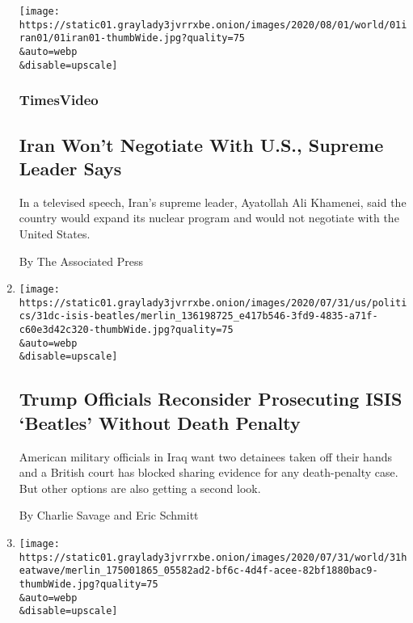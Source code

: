 \begin{enumerate}
  \texttt{[image: https://static01.graylady3jvrrxbe.onion/images/2020/08/01/world/01iran01/01iran01-thumbWide.jpg?quality=75\\\&auto=webp\\\&disable=upscale]}

  \hypertarget{timesvideo}{%
  \subsubsection{TimesVideo}\label{timesvideo}}

  \hypertarget{iran-wont-negotiate-with-us-supreme-leader-says}{%
  \subsection{Iran Won't Negotiate With U.S., Supreme Leader
  Says}\label{iran-wont-negotiate-with-us-supreme-leader-says}}

  In a televised speech, Iran's supreme leader, Ayatollah Ali Khamenei,
  said the country would expand its nuclear program and would not
  negotiate with the United States.

  By The Associated Press
\item
  \href{/2020/07/31/world/middleeast/isis-beatles-hostages.html}{}

  \texttt{[image: https://static01.graylady3jvrrxbe.onion/images/2020/07/31/us/politics/31dc-isis-beatles/merlin\_136198725\_e417b546-3fd9-4835-a71f-c60e3d42c320-thumbWide.jpg?quality=75\\\&auto=webp\\\&disable=upscale]}

  \hypertarget{trump-officials-reconsider-prosecuting-isis-beatles-without-death-penalty}{%
  \subsection{Trump Officials Reconsider Prosecuting ISIS `Beatles'
  Without Death
  Penalty}\label{trump-officials-reconsider-prosecuting-isis-beatles-without-death-penalty}}

  American military officials in Iraq want two detainees taken off their
  hands and a British court has blocked sharing evidence for any
  death-penalty case. But other options are also getting a second look.

  By Charlie Savage and Eric Schmitt
\item
  \href{/2020/07/31/world/middleeast/Middle-East-heat-wave.html}{}

  \texttt{[image: https://static01.graylady3jvrrxbe.onion/images/2020/07/31/world/31heatwave/merlin\_175001865\_05582ad2-bf6c-4d4f-acee-82bf1880bac9-thumbWide.jpg?quality=75\\\&auto=webp\\\&disable=upscale]}


\end{enumerate}
